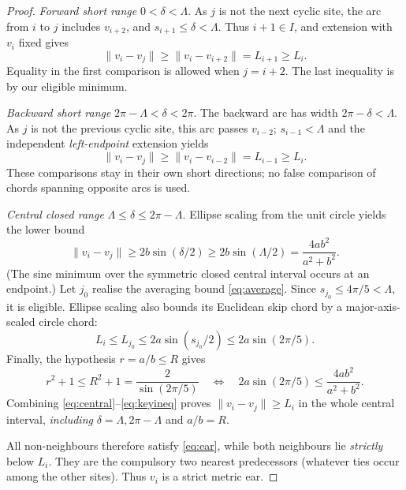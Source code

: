 \documentclass[11pt,a4paper]{article}
\theoremstyle{definition}\newtheorem{definition}[theorem]{Definition}
\theoremstyle{remark}\newtheorem{remark}[theorem]{Remark}
\newcommand{\Rbound}{R}
\newcommand{\dist}[2]{\lVert #1-#2\rVert}
\begin{document}
\begin{proof}
\emph{Forward short range} $0<\delta<\Lambda$. As $j$ is not the next cyclic site, the arc from $i$ to $j$ includes $v_{i+2}$, and $s_{i+1}\le\delta<\Lambda$. Thus $i+1\in I$, and extension with $v_i$ fixed gives
\begin{equation}\label{eq:fwd}
 \dist{v_i}{v_j}\ge\dist{v_i}{v_{i+2}}
 =L_{i+1}\ge L_i.
\end{equation}
Equality in the first comparison is allowed when $j=i+2$. The last inequality is by our eligible minimum.

\emph{Backward short range} $2\pi-\Lambda<\delta<2\pi$. The backward arc has width $2\pi-\delta<\Lambda$. As $j$ is not the previous cyclic site, this arc passes $v_{i-2}$; $s_{i-1}<\Lambda$ and the independent \emph{left-endpoint} extension yields
\begin{equation}\label{eq:back}
 \dist{v_i}{v_j}\ge\dist{v_i}{v_{i-2}}
 =L_{i-1}\ge L_i.
\end{equation}
These comparisons stay in their own short directions; no false comparison of chords spanning opposite arcs is used.

\emph{Central closed range} $\Lambda\le\delta\le2\pi-\Lambda$. Ellipse scaling from the unit circle yields the lower bound
\begin{equation}\label{eq:central}
 \dist{v_i}{v_j}\ge2b\sin(\delta/2)
 \ge2b\sin(\Lambda/2)=\frac{4ab^2}{a^2+b^2}.
\end{equation}
(The sine minimum over the symmetric closed central interval occurs at an endpoint.) Let $j_0$ realise the averaging bound \eqref{eq:average}. Since $s_{j_0}\le4\pi/5<\Lambda$, it is eligible. Ellipse scaling also bounds its Euclidean skip chord by a major-axis-scaled circle chord:
\begin{equation}\label{eq:skip}
 L_i\le L_{j_0}\le2a\sin(s_{j_0}/2)
 \le2a\sin(2\pi/5).
\end{equation}
Finally, the hypothesis $r=a/b\le\Rbound$ gives
\begin{equation}\label{eq:keyineq}
 r^2+1\le\Rbound^2+1=\frac{2}{\sin(2\pi/5)}
 \quad\Longleftrightarrow\quad
 2a\sin(2\pi/5)\le\frac{4ab^2}{a^2+b^2}.
\end{equation}
Combining \eqref{eq:central}--\eqref{eq:keyineq} proves $\dist{v_i}{v_j}\ge L_i$ in the whole central interval, \emph{including} $\delta=\Lambda,2\pi-\Lambda$ and $a/b=\Rbound$.

All non-neighbours therefore satisfy \eqref{eq:ear}, while both neighbours lie \emph{strictly} below $L_i$. They are the compulsory two nearest predecessors (whatever ties occur among the other sites). Thus $v_i$ is a strict metric ear.
\end{proof}
\end{document}
